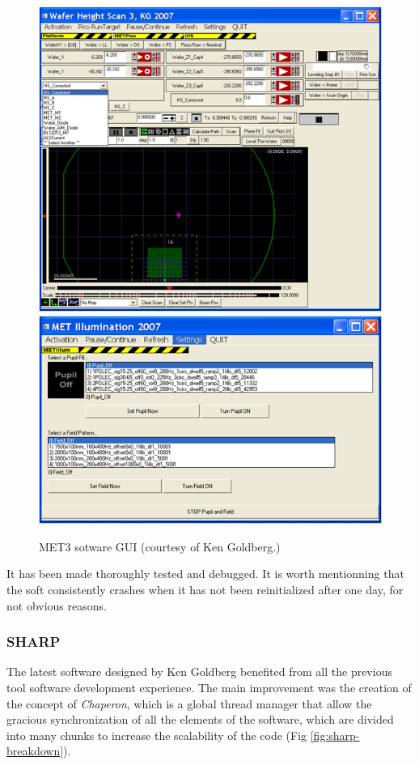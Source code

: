\documentclass[10pt,letter,twoside]{report}
\begin{document}
\begin{figure}[ht]
{			\includegraphics[scale=0.5]{img/met3-wafer.png}
			\includegraphics[scale=0.5]{img/met3-illumination.png}}
			\caption{MET3 sotware GUI (courtesy of Ken Goldberg.)}
			\label{fig:met3-elements}
			\end{figure}
			It has been made thoroughly tested and debugged. 
			It is worth mentionning that the soft consistently crashes when it has not been reinitialized after one day, for not obvious reasons.
		
			\subsubsection{SHARP}
			The latest software designed by Ken Goldberg benefited from all the previous tool software development experience. 
			The main improvement was the creation of the concept of \textit{Chaperon}, 
			which is a global thread manager that allow the gracious synchronization of all the elements of the software, which are divided into many chunks to increase the scalability of the code (Fig \ref{fig:sharp-breakdown}).
			
\end{document}
